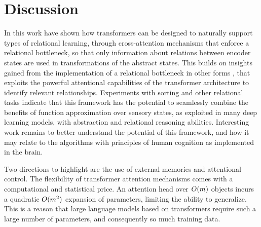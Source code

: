 \section{Discussion}
\label{sec:discuss}



In this work have shown how transformers
can be designed to
%
naturally support types of relational learning, through cross-attention
mechanisms that enforce a relational bottleneck, so that only information about relations between encoder states
are used in transformations of the abstract states.
This builds on insights gained from the implementation of a relational bottleneck in other forms \citep{esbn, kerg2022neural},
that exploits the powerful attentional capabilities of the transformer architecture to identify relevant relationships.
%
Experiments with sorting and other relational tasks indicate that this framework has the potential to seamlessly combine the benefits of function approximation over sensory states, as exploited in many deep learning models, with abstraction and relational reasoning abilities. Interesting
work remains to better understand the potential of this framework, and
how it may relate to the algorithms with principles of human cognition as implemented in the brain.

Two directions to highlight are the use of external memories and attentional control. The flexibility of transformer attention mechanisms comes with a computational and statistical price. An attention head over 
$O(m)$ objects incurs a quadratic $O(m^2)$ expansion of parameters, limiting the ability to generalize. This is a reason that large language models based on transformers require such a large number of parameters, and consequently so much training data. 

